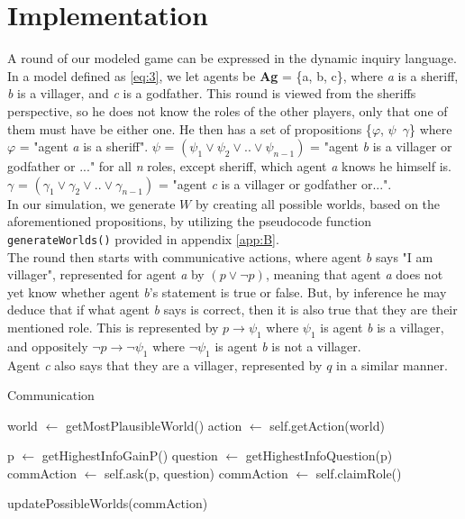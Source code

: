 \section{Implementation}\label{sec:implementation}
A round of our modeled game can be expressed in the dynamic inquiry language.
In a model defined as \cref{eq:3}, we let agents be \textbf{Ag} = \{a, b, c\},
where \textit{a} is a sheriff, \textit{b} is a villager, and \textit{c} is a
godfather. This round is viewed from the sheriffs perspective, so he does not
know the roles of the other players, only that one of them must have be either
one. He then has a set of propositions \{$\varphi$, $\psi$\, $\gamma$\} where
$\varphi$ = "agent \textit{a} is a sheriff". $\psi$ = $(\psi_1 \lor \psi_2 \lor
	.. \lor \psi_{n-1})$ = "agent \textit{b} is a villager or godfather or ..." for
all \textit{n} roles, except sheriff, which agent \textit{a} knows he himself
is. $\gamma$ = $(\gamma_1 \lor \gamma_2 \lor .. \lor \gamma_{n-1}) $ = "agent
\textit{c} is a villager or godfather or...". \\ In our simulation, we generate
$W$ by creating all possible worlds, based on the aforementioned propositions,
by utilizing the pseudocode function \lstinline{generateWorlds()} provided in
appendix \ref{app:B}. \\ The round then starts with communicative actions,
where agent \textit{b} says "I am villager", represented for agent \textit{a}
by $(p \lor \neg p)$, meaning that agent \textit{a} does not yet know whether
agent \textit{b}'s statement is true or false. But, by inference he may deduce
that if what agent \textit{b} says is correct, then it is also true that they
are their mentioned role. This is represented by $p \rightarrow \psi_1$ where
$\psi_1$ is agent \textit{b} is a villager, and oppositely $\neg p \rightarrow
	\neg \psi_1$ where $\neg \psi_1$ is agent \textit{b} is not a villager. \\
Agent \textit{c} also says that they are a villager, represented by $q$ in a
similar manner.

\begin{algorithm}
	\caption{Communication}
	\begin{algorithmic}[1]
		\State world $\gets$ getMostPlausibleWorld()
		\State action $\gets$ self.getAction(world)

		\State p $\gets$ getHighestInfoGainP()
		\State question $\gets$ getHighestInfoQuestion(p)
		\State commAction $\gets$ self.ask(p, question)
		\State commAction $\gets$ self.claimRole()
		\EndIf

		\State updatePossibleWorlds(commAction)
		\EndFunction
	\end{algorithmic}
\end{algorithm}\label{lst:communicate}

